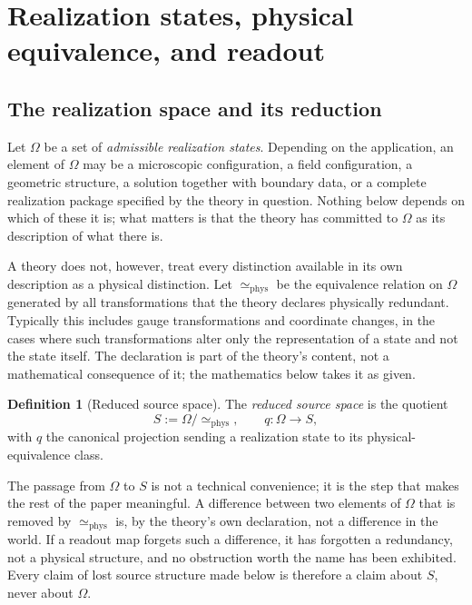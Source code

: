 \documentclass[11pt,reqno]{amsart}
\theoremstyle{plain}
\theoremstyle{definition}
\newtheorem{definition}[theorem]{Definition}
\theoremstyle{remark}
\newcommand{\phe}{\simeq_{\mathrm{phys}}}
\newcommand{\Om}{\Omega}
\begin{document}
\section{Realization states, physical equivalence, and readout}
\label{sec:setup}

\subsection{The realization space and its reduction}

Let $\Om$ be a set of \emph{admissible realization states}. Depending on the application, an element of $\Om$ may be a microscopic configuration, a field configuration, a geometric structure, a solution together with boundary data, or a complete realization package specified by the theory in question. Nothing below depends on which of these it is; what matters is that the theory has committed to $\Om$ as its description of what there is.

A theory does not, however, treat every distinction available in its own description as a physical distinction. Let $\phe$ be the equivalence relation on $\Om$ generated by all transformations that the theory declares physically redundant. Typically this includes gauge transformations and coordinate changes, in the cases where such transformations alter only the representation of a state and not the state itself. The declaration is part of the theory's content, not a mathematical consequence of it; the mathematics below takes it as given.

\begin{definition}[Reduced source space]
\label{def:reduced}
The \emph{reduced source space} is the quotient
\begin{equation}
\label{eq:reduced}
S:=\Om/\!\phe,
\qquad
q\colon\Om\longrightarrow S,
\end{equation}
with $q$ the canonical projection sending a realization state to its physical-equivalence class.
\end{definition}

The passage from $\Om$ to $S$ is not a technical convenience; it is the step that makes the rest of the paper meaningful. A difference between two elements of $\Om$ that is removed by $\phe$ is, by the theory's own declaration, not a difference in the world. If a readout map forgets such a difference, it has forgotten a redundancy, not a physical structure, and no obstruction worth the name has been exhibited. Every claim of lost source structure made below is therefore a claim about $S$, never about $\Om$.
\end{document}
